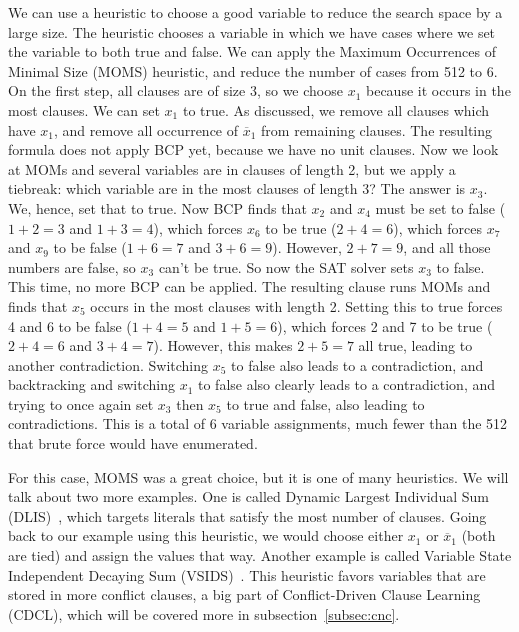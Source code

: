 \documentclass[12pt]{article}
\theoremstyle{definition}
\begin{document}
We can use a heuristic to choose a good variable to reduce the search space by a large size. The  heuristic chooses a variable in which we have cases where we set the variable to both true and false. We can apply the Maximum Occurrences of Minimal Size (MOMS) heuristic, and reduce the number of cases from 512 to 6. On the first step, all clauses are of size 3, so we choose $x_1$ because it occurs in the most clauses. We can set $x_1$ to true. As discussed, we remove all clauses which have $x_1$, and remove all occurrence of $\overline{x}_1$ from remaining clauses. The resulting formula does not apply BCP yet, because we have no unit clauses. Now we look at MOMs and several variables are in clauses of length 2, but we apply a tiebreak: which variable are in the most clauses of length 3? The answer is $x_3$. We, hence, set that to true. Now BCP finds that $x_2$ and $x_4$ must be set to false ($1+2 = 3$ and $1+3 = 4$), which forces $x_6$ to be true ($2+4=6$), which forces $x_7$ and $x_9$ to be false ($1+6 = 7$ and $3+6 = 9$). However, $2+7=9$, and all those numbers are false, so $x_3$ can't be true. So now the SAT solver sets $x_3$ to false. This time, no more BCP can be applied. The resulting clause runs MOMs and finds that $x_5$ occurs in the most clauses with length 2. Setting this to true forces 4 and 6 to be false ($1+4 = 5$ and $1+5 = 6$), which forces 2 and 7 to be true ($2+4=6$ and $3+4=7$). However, this makes $2+5 = 7$ all true, leading to another contradiction. Switching $x_5$ to false also leads to a contradiction, and backtracking and switching $x_1$ to false also clearly leads to a contradiction, and trying to once again set $x_3$ then $x_5$ to true and false, also leading to contradictions. This is a total of 6 variable assignments, much fewer than the 512 that brute force would have enumerated. \par
For this case, MOMS was a great choice, but it is one of many heuristics. We will talk about two more examples. One is called Dynamic Largest Individual Sum (DLIS)~\cite{Silva:1999:IBH:645377.651196}, which targets literals that satisfy the most number of clauses. Going back to our example using this heuristic, we would choose either $x_1$ or $\overline{x}_1$ (both are tied) and assign the values that way. Another example is called Variable State Independent Decaying Sum (VSIDS)~\cite{Moskewicz:2001}. This heuristic favors variables that are stored in more conflict clauses, a big part of Conflict-Driven Clause Learning (CDCL), which will be covered more in subsection~\ref{subsec:cnc}. \par
\end{document}
